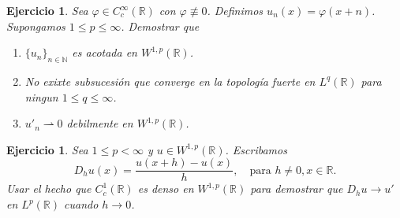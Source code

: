 \documentclass{article}
\newcounter{ejer}
\newtheorem{ejercicio}[ejer]{Ejercicio}}
\newcommand{\rr}{\mathbb{R}}
\newcommand{\nn}{\mathbb{N}}
\begin{document}
\begin{ejercicio}  Sea $\varphi\in C_c^{\infty}(\rr)$ con $\varphi\not\equiv 0$. Definimos $u_n(x)=\varphi(x+n)$. Supongamos $1\leq p\leq \infty$. Demostrar que
 \begin{enumerate}
  \item $\{u_n\}_{n\in\nn}$ es acotada en $W^{1,p}(\rr)$.
  \item No exixte subsucesión que converge en la topología fuerte en  $L^q(\rr)$ para ningun  $1\leq q\leq \infty$.
   \item $ u'_{n} \rightharpoonup 0$ debilmente en $W^{1,p}(\rr)$.
 \end{enumerate}
\end{ejercicio}

\begin{ejercicio} Sea $1\leq p<\infty$ y $u\in W^{1,p}(\rr)$. Escribamos
\[D_hu(x)=\frac{u(x+h)-u(x)}{h},\quad\text{para } h\neq 0, x\in\rr.\]
Usar el hecho que $C_c^1(\rr)$ es denso en $W^{1,p}(\rr)$ para demostrar que $D_hu\to u'$ en $L^p(\rr)$ cuando $h\to 0$.
\end{ejercicio}
\end{document}
